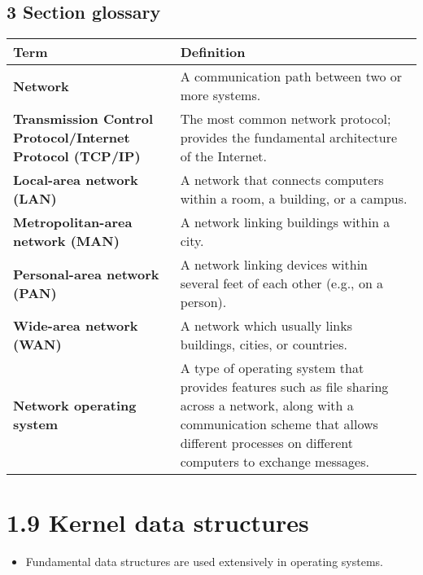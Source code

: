 \documentclass{article}
\begin{document}
\subsection*{3 Section glossary}
\centering
\begin{tabular}{>{\raggedright}p{} >{\raggedright\arraybackslash}p{}}
\toprule
\textbf{Term} & \textbf{Definition} \\
\midrule
\textbf{Network} & A communication path between two or more systems. \\
\textbf{Transmission Control Protocol/Internet Protocol (TCP/IP)} & The most common network protocol; provides the fundamental architecture of the Internet. \\
\textbf{Local-area network (LAN)} & A network that connects computers within a room, a building, or a campus. \\
\textbf{Metropolitan-area network (MAN)} & A network linking buildings within a city. \\
\textbf{Personal-area network (PAN)} & A network linking devices within several feet of each other (e.g., on a person). \\
\textbf{Wide-area network (WAN)} & A network which usually links buildings, cities, or countries. \\
\textbf{Network operating system} & A type of operating system that provides features such as file sharing across a network, along with a communication scheme that allows different processes on different computers to exchange messages. \\
\bottomrule
\end{tabular}
\vspace{\baselineskip}
\newpage
\section*{1.9 Kernel data structures}
\begin{itemize}
    \item Fundamental data structures are used extensively in operating systems.
\end{itemize}
\end{document}
